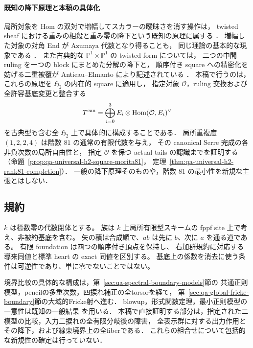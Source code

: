 \documentclass[a4paper,11pt]{ltjsarticle}
\numberwithin{equation}{section}
\theoremstyle{plain}
\theoremstyle{definition}
\theoremstyle{remark}
\newcommand{\kk}{k}
\begin{document}
\paragraph{既知の降下原理と本稿の具体化}
局所対象を Hom の双対で増幅してスカラーの曖昧さを消す操作は，
twisted sheaf における重みの相殺と重み零の降下という既知の原理に属する
\cite[Lemma 2.1.1.13]{LieblichTwisted2007}
\cite[Lemma 3.1.1.7]{LieblichPeriodIndex2008}．
増幅した対象の対角 End が Azumaya 代数となり得ることも，
同じ理論の基本的な現象である
\cite[Proposition 3.1.2.1 and its proof]{LieblichPeriodIndex2008}．
また古典的な $\mathbb P^1\times\mathbb P^1$ の twisted form については，
二つの中間 ruling を一つの block にまとめた分解の降下と，
順序付き square への精密化を妨げる二重被覆が
Antieau--Elmanto により記述されている
\cite[Section 5.3, Proposition 5.7]{AntieauElmanto2021}．
本稿で行うのは，これらの原理を $\mathfrak H_2$ の内在的 square に適用し，
指定対象 $\mathcal O$，ruling 交換および全許容基底変更と整合する
\[
 T^{\rm can}
   =\bigoplus_{i=0}^3
       E_i\otimes\operatorname{Hom}(\mathcal O,E_i)^\vee
\]
を古典型も含む全 $\mathfrak H_2$ 上で具体的に構成することである．
局所重複度 $(1,2,2,4)$ は階数 $81$ の通常の有限代数を与え，
その canonical Serre 完成の各非負次数の局所自由性と，
指定 $\mathcal O$ を保つ actual tails の認識までを証明する
（命題~\ref{prop:qa-universal-h2-square-morita81}，
定理~\ref{thm:qa-universal-h2-rank81-completion}）．
一般の降下原理そのものや，階数 $81$ の最小性を新規な主張とはしない．


\subsection{規約}

$\kk$ は標数零の代数閉体とする。
族は $\kk$ 上局所有限型スキームの fppf site 上で考え、非被約基底を含む。
矢の積は合成順で、$ab$ は先に $b$、次に $a$ を通る道である。
有限 foundation は四つの順序付き頂点を保持し、
右加群規約に対応する導来同値と標準 heart の exact 同値を区別する。
基底上の係数を消去に使う条件は可逆性であり、単に零でないことではない。

境界比較の具体的な構成は，第~\ref{sec:qa-spectral-boundary-models}節の
共通正則模型，pencilの多重次数，四捩れ補正の全torsorを経て，
第~\ref{sec:qa-global-fricke-boundary}節の大域的Fricke射へ進む．
blowup，形式関数定理，最小正則模型の一意性は既知の一般結果
\cite{StacksBlowups,StacksFormalFunctions,StacksMinimalModels}を用いる．
本稿で直接証明する部分は，指定された二模型の比較，入力二捩れの全有限分岐後の障害，
全表示群に対する出力作用とその降下，および線束境界上の全fiberである．
これらの組合せについて包括的な新規性の確定は行っていない．
\end{document}
